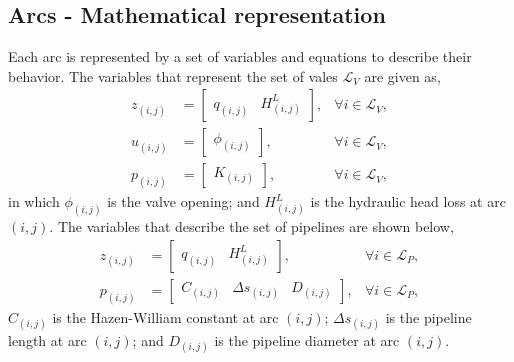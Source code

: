 \subsection{Arcs - Mathematical representation}
    \par Each arc is represented by a set of variables and equations to describe their behavior. The variables that represent the set of vales $\mathcal{L}_V$ are given as,
    \begin{subequations}
        \begin{alignat}{3}
            z_{(i,j)} &= \left[\begin{array}{ccc}
                q_{(i,j)} & H^L_{(i,j)}
            \end{array}\right],  & \forall i \in \mathcal{L}_V, \\
            u_{(i,j)} &= \left[\begin{array}{ccc}
                \phi_{(i,j)}
            \end{array}\right],  & \forall i \in \mathcal{L}_V, \\
            p_{(i,j)} &= \left[\begin{array}{cc}
                K_{(i,j)}
            \end{array}\right], & \forall i \in \mathcal{L}_V,
        \end{alignat}
    \end{subequations}
    in which $\phi_{(i,j)}$ is the valve opening; and $H^L_{(i,j)}$ is the hydraulic head loss at arc ${(i,j)}$. The variables that describe the set of pipelines are shown below,
    \begin{subequations}
        \begin{alignat}{2}
            z_{(i,j)} &= \left[\begin{array}{ccc}
                q_{(i,j)} & H^L_{(i,j)}
            \end{array}\right], & \forall i \in \mathcal{L}_P,
            \\
            p_{(i,j)} &= \left[\begin{array}{ccc}
                C_{(i,j)} & \Delta s_{(i,j)} & D_{(i,j)}
            \end{array}\right], & \forall i \in \mathcal{L}_P,
        \end{alignat}
    \end{subequations}
    $C_{(i,j)}$ is the Hazen-William constant at arc ${(i,j)}$;
    $\Delta s_{(i,j)}$ is the pipeline length at arc ${(i,j)}$;
    and $D_{(i,j)}$ is the pipeline diameter at arc ${(i,j)}$. 
